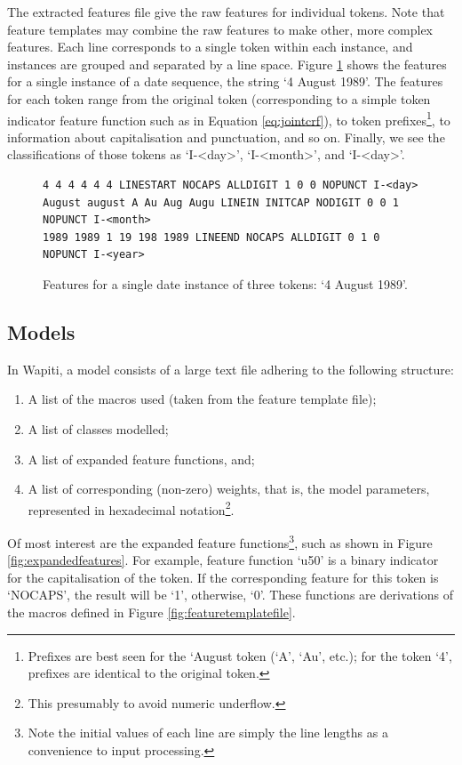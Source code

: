 The extracted features file give the raw features for individual tokens. Note that feature templates may combine the raw features to make other, more complex features. Each line corresponds to a single token within each instance, and instances are grouped and separated by a line space. Figure \ref{fig:extractedfeatures} shows the features for a single instance of a date sequence, the string `4 August 1989'. The features for each token range from the original token (corresponding to a simple token indicator feature function such as in Equation \ref{eq:jointcrf}), to token prefixes\footnote{Prefixes are best seen for the `August token (`A', `Au', etc.); for the token `4', prefixes are identical to the original token.}, to information about capitalisation and punctuation, and so on. Finally, we see the classifications of those tokens as `I-<day>', `I-<month>', and `I-<day>'.

\begin{figure}
\centering
\begin{BVerbatim}
4 4 4 4 4 4 LINESTART NOCAPS ALLDIGIT 1 0 0 NOPUNCT I-<day>
August august A Au Aug Augu LINEIN INITCAP NODIGIT 0 0 1 NOPUNCT I-<month>
1989 1989 1 19 198 1989 LINEEND NOCAPS ALLDIGIT 0 1 0 NOPUNCT I-<year>
\end{BVerbatim}
\caption{Features for a single date instance of three tokens: `4 August 1989'.}
\label{fig:extractedfeatures}
\end{figure}

\subsection{Models}

In Wapiti, a model consists of a large text file adhering to the following structure:

\begin{enumerate}
\item A list of the macros used (taken from the feature template file);
\item A list of classes modelled;
\item A list of expanded feature functions, and;
\item A list of corresponding (non-zero) weights, that is, the model parameters, represented in hexadecimal notation\footnote{This presumably to avoid numeric underflow.}.
\end{enumerate}

Of most interest are the expanded feature functions\footnote{Note the initial values of each line are simply the line lengths as a convenience to input processing.}, such as shown in Figure \ref{fig:expandedfeatures}. For example, feature function `u50' is a binary indicator for the capitalisation of the token. If the corresponding feature for this token is `NOCAPS', the result will be `1', otherwise, `0'. These functions are derivations of the macros defined in Figure \ref{fig:featuretemplatefile}.

